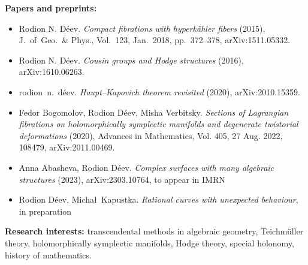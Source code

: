 \documentclass{article}
\begin{document}
\begin{description}
\item {\bf Papers and preprints:} \begin{itemize}
     \item Rodion N. D\'eev. {\em 
     Compact fibrations with hyperk\"ahler fibers} (2015), J.~of~Geo.~\& Phys., 
     Vol.~123, Jan.~2018, pp.~372--378, arXiv:1511.05332.
     \item Rodion N. D\'eev. {\em
     Cousin groups and Hodge structures} (2016), arXiv:1610.06263.
     \item rodion~n.~d\'eev. {\em Haupt--Kapovich theorem revisited} (2020),
     arXiv:2010.15359.
     \item Fedor Bogomolov, Rodion D\'eev, Misha Verbitsky. {\em 
     Sections of Lagrangian fibrations on holomorphically symplectic manifolds 
     and degenerate twistorial deformations} (2020),  Advances in Mathematics, 
     Vol.  405,  27 Aug.  2022,  108479,  arXiv:2011.00469.
     \item Anna Abasheva,  Rodion D\'eev.  {\em Complex surfaces with many 
     algebraic  structures} (2023),  arXiv:2303.10764,  to appear in IMRN
     \item Rodion D\'eev,  Micha\l~Kapustka.  {\em Rational curves with unexpected
     behaviour},  in preparation
\end{itemize}
\vspace{1mm}

\item {\bf Research interests:} transcendental methods in algebraic geometry, 
Teichm\"uller theory, holomorphically symplectic manifolds, Hodge theory, 
special holonomy, history of mathematics.

\end{description}
\end{document}
